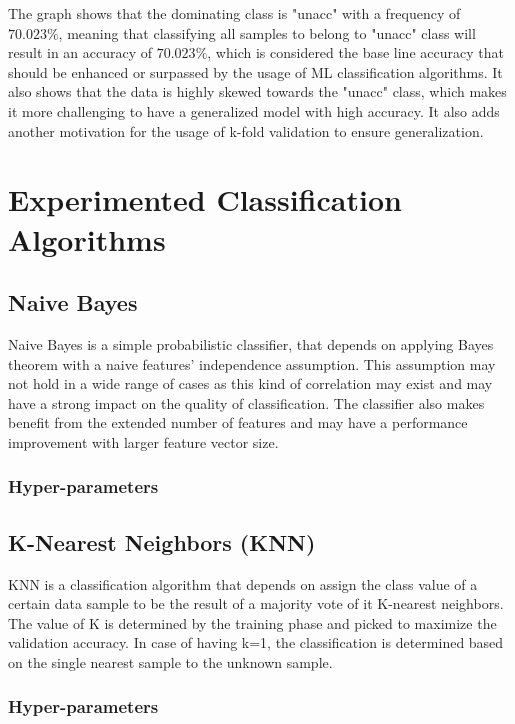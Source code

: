 \documentclass{article}
\begin{document}
The graph shows that the dominating class is "unacc" with a frequency of $70.023 \% $, meaning that classifying all samples to belong to "unacc" class will result in an accuracy of $70.023 \% $, which is considered the base line accuracy that should be enhanced or surpassed by the usage of ML classification algorithms. It also shows that the data is highly skewed towards the "unacc" class, which makes it more challenging to have a generalized model with high accuracy. It also adds another motivation for the usage of k-fold validation to ensure generalization.

\section{Experimented Classification Algorithms}

\subsection{Naive Bayes}
Naive Bayes is a simple probabilistic classifier, that depends on applying Bayes theorem with a naive features' independence assumption. This assumption may not hold in a wide range of cases as this kind of correlation may exist and may have a strong impact on the quality of classification. The classifier also makes benefit from the extended number of features and may have a performance improvement with larger feature vector size.
\subsubsection*{Hyper-parameters}


\subsection{K-Nearest Neighbors (KNN)}
KNN is a classification algorithm that depends on assign the class value of a certain data sample to be the result of a majority vote of it K-nearest neighbors. The value of K is determined by the training phase and picked to maximize the validation accuracy. In case of having k=1, the classification is determined based on the single nearest sample to the unknown sample. 
\subsubsection*{Hyper-parameters}

\end{document}
